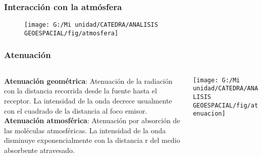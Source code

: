 \documentclass[14pt]{beamer}
\begin{document}
\begin{frame}
\frametitle{Interacción con la atmósfera}
  \begin{figure}
    \centering
    \texttt{[image: G:/Mi unidad/CATEDRA/ANALISIS GEOESPACIAL/fig/atmosfera]}
  \end{figure}
\end{frame}
\begin{frame}
\frametitle{Atenuación}
  \begin{columns}
		\begin{column}{.4\linewidth}
		 \scriptsize{\textbf{Atenuación geométrica}: Atenuación de la radiación con la distancia recorrida desde la fuente hasta el receptor. La intensidad de la onda decrece usualmente con el cuadrado de la distancia al foco emisor.\\
\textbf{Atenuación atmosférica}: Atenuación por absorción de las moléculas atmosféricas. La intensidad de la onda disminuye exponencialmente con la distancia r del medio absorbente atravesado.}
		\end{column}
		\begin{column}{.6\linewidth}
			 \texttt{[image: G:/Mi unidad/CATEDRA/ANALISIS GEOESPACIAL/fig/atenuacion]}
		\end{column}
	\end{columns}
\end{frame}
\end{document}
